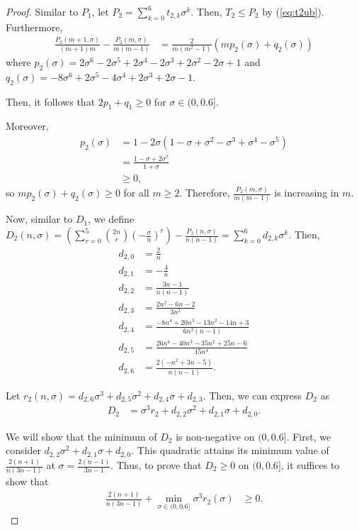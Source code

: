 \documentclass{article}
\theoremstyle{plain}
\theoremstyle{definition}
\theoremstyle{remark}
\def\bigopen#1{\left(#1\right)}
\begin{document}
\begin{proof}
Similar to $P_1$, let $P_2=\sum_{k=0}^6 t_{2,k}\sigma^k$. Then, $T_2\le P_2$ by (\ref{eq:t2ub}). Furthermore, 
\begin{align}
    \label{eq:p2diff}
   \frac{P_2(m+1, \sigma)}{(m+1)m} - \frac{P_2(m, \sigma)}{m(m-1)} &= \frac{2}{m(m^2-1)} \bigopen{ mp_2(\sigma) + q_2(\sigma) }
\end{align}
where $p_2(\sigma)=2 \sigma^6 - 2 \sigma^5 + 2 \sigma^4 - 2 \sigma^3 + 2 \sigma^2 - 2 \sigma + 1$ and $q_2(\sigma) = - 8\sigma^6 + 2\sigma^5 - 4\sigma^4 + 2\sigma^3 + 2\sigma - 1$.

Then, it follows that $2p_1 + q_1 \ge 0$ for $\sigma \in (0, 0.6]$.

Moreover, 
\begin{align*}
    p_2(\sigma) &= 1-2\sigma(1-\sigma+\sigma^2-\sigma^3+\sigma^4-\sigma^5) \\
    &= \frac{1-\sigma+2\sigma^7}{1+\sigma} \\
    &\ge 0,
\end{align*}
so $mp_2(\sigma)+q_2(\sigma)\ge 0$ for all $m\ge 2$. Therefore, $\frac{P_2(m, \sigma)}{m(m-1)}$ is increasing in $m$.

Now, similar to $D_1$, we define $D_2(n, \sigma) = \bigopen{\sum_{r=0}^5 \binom{2n}{r} \bigopen{ -\frac{\sigma}{n} }^r} - \frac{P_2(n, \sigma)}{n(n-1)} = \sum_{k=0}^6 d_{2,k}\sigma^k$. Then,
\begin{align*}
    d_{2, 0} &= \frac{2}{n}\\
    d_{2, 1} &= - \frac{4}{n}\\
    d_{2, 2} &= \frac{3 n - 1}{n \bigopen{n - 1}}\\
    d_{2, 3} &= \frac{2n^2 - 6n - 2}{3n^2} \\
    d_{2, 4} &= \frac{- 8 n^4 + 20 n^3 - 13 n^2 - 14 n + 3}{6 n^3 \bigopen{n - 1}}\\
    d_{2, 5} &= \frac{26 n^4 - 40 n^3 - 35 n^2 + 25 n - 6}{15 n^4}\\
    d_{2, 6} &= \frac{2 \bigopen{- n^2 + 3 n - 5}}{n \bigopen{n - 1}}.
\end{align*}

Let $r_2(n, \sigma) = d_{2,6}\sigma^3 + d_{2,5}\sigma^2 + d_{2,4}\sigma + d_{2,3}$. Then, we can express $D_2$ as 
\begin{align*}
    D_2 &= \sigma^3 r_2 + d_{2,2}\sigma^2 + d_{2,1}\sigma + d_{2,0}.
\end{align*}

We will show that the minimum of $D_2$ is non-negative on $(0, 0.6]$. First, we consider $d_{2,2}\sigma^2 + d_{2,1}\sigma + d_{2,0}$. This quadratic attains its minimum value of $\frac{2(n+1)}{n(3n-1)}$ at $\sigma = \frac{2(n-1)}{3n-1}$. Thus, to prove that $D_2\ge 0$ on $(0, 0.6]$, it suffices to show that 
\begin{align*}
    \frac{2(n+1)}{n(3n-1)} + \min_{\sigma \in (0, 0.6]} \sigma^3 r_2(\sigma) &\ge 0.
\end{align*}


\end{proof}
\end{document}
